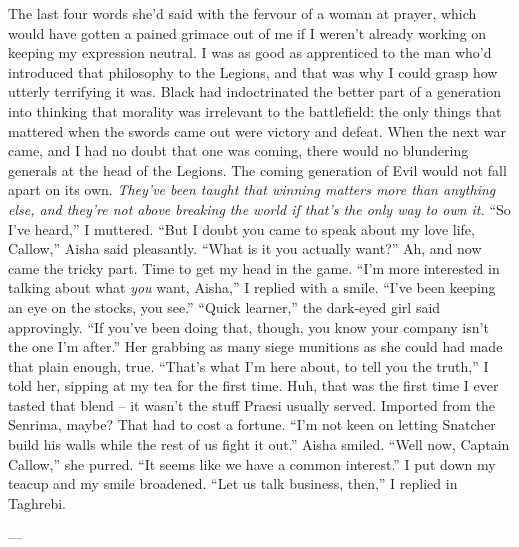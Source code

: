 \documentclass[12pt, openany]{book}
\begin{document}
The last four words she’d said with the fervour of a woman at prayer, which would have gotten a pained grimace out of me if I weren’t already working on keeping my expression neutral. I was as good as apprenticed to the man who’d introduced that philosophy to the Legions, and that was why I could grasp how utterly terrifying it was. Black had indoctrinated the better part of a generation into thinking that morality was irrelevant to the battlefield: the only things that mattered when the swords came out were victory and defeat. When the next war came, and I had no doubt that one was coming, there would no blundering generals at the head of the Legions. The coming generation of Evil would not fall apart on its own. \textit{They’ve been taught that winning matters more than anything else, and they’re not above breaking the world if that’s the only way to own it.}
“So I’ve heard,” I muttered.
“But I doubt you came to speak about my love life, Callow,” Aisha said pleasantly. “What is it you actually want?”
Ah, and now came the tricky part. Time to get my head in the game.
“I’m more interested in talking about what \textit{you} want, Aisha,” I replied with a smile. “I’ve been keeping an eye on the stocks, you see.”
“Quick learner,” the dark-eyed girl said approvingly. “If you’ve been doing that, though, you know your company isn’t the one I’m after.”
Her grabbing as many siege munitions as she could had made that plain enough, true.
“That’s what I’m here about, to tell you the truth,” I told her, sipping at my tea for the first time. Huh, that was the first time I ever tasted that blend – it wasn’t the stuff Praesi usually served. Imported from the Senrima, maybe? That had to cost a fortune. “I’m not keen on letting Snatcher build his walls while the rest of us fight it out.”
Aisha smiled.
“Well now, Captain Callow,” she purred. “It seems like we have a common interest.”
I put down my teacup and my smile broadened.
“Let us talk business, then,” I replied in Taghrebi.

—
\end{document}
